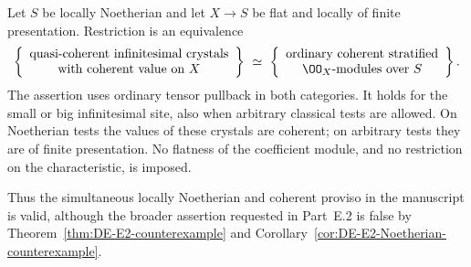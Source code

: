 \begin{theorem}\label{thm:DE-E2-coherent-Noetherian}
Let $S$ be locally Noetherian and let $X\to S$ be flat and locally of finite presentation.  Restriction is an equivalence
\[
 \left\{\begin{array}{c}
 \text{quasi-coherent infinitesimal crystals}\\
 \text{with coherent value on }X
 \end{array}\right\}
 \ \simeq\
 \left\{\begin{array}{c}
 \text{ordinary coherent stratified}\\
 \OO_X\text{-modules over }S
 \end{array}\right\}.
\]
The assertion uses ordinary tensor pullback in both categories.  It holds for the small or big infinitesimal site, also when arbitrary classical tests are allowed.  On Noetherian tests the values of these crystals are coherent; on arbitrary tests they are of finite presentation.  No flatness of the coefficient module, and no restriction on the characteristic, is imposed.

Thus the simultaneous locally Noetherian and coherent proviso in the manuscript is valid, although the broader assertion requested in Part~E.2 is false by Theorem~\ref{thm:DE-E2-counterexample} and Corollary~\ref{cor:DE-E2-Noetherian-counterexample}.
\end{theorem}
